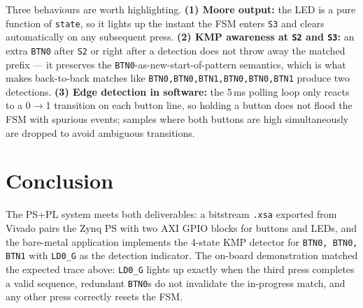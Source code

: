 \documentclass[11pt,letterpaper]{article}
\begin{document}
Three behaviours are worth highlighting. \textbf{(1) Moore output:}
the LED is a pure function of \texttt{state}, so it lights up the
instant the FSM enters \texttt{S3} and clears automatically on any
subsequent press. \textbf{(2) KMP awareness at \texttt{S2} and
\texttt{S3}:} an extra \texttt{BTN0} after \texttt{S2} or right after a
detection does not throw away the matched prefix --- it preserves the
\texttt{BTN0}-as-new-start-of-pattern semantics, which is what makes
back-to-back matches like \texttt{BTN0,BTN0,BTN1,BTN0,BTN0,BTN1}
produce two detections. \textbf{(3) Edge detection in software:}
the 5\,ms polling loop only reacts to a 0$\rightarrow$1 transition on
each button line, so holding a button does not flood the FSM with
spurious events; samples where both buttons are high simultaneously
are dropped to avoid ambiguous transitions.

\section{Conclusion}

The PS+PL system meets both deliverables: a bitstream \texttt{.xsa}
exported from Vivado pairs the Zynq PS with two AXI GPIO blocks for
buttons and LEDs, and the bare-metal application implements the
4-state KMP detector for \texttt{BTN0, BTN0, BTN1} with
\texttt{LD0\_G} as the detection indicator. The on-board demonstration
matched the expected trace above: \texttt{LD0\_G} lights up exactly
when the third press completes a valid sequence, redundant
\texttt{BTN0}s do not invalidate the in-progress match, and any other
press correctly resets the FSM.
\end{document}
